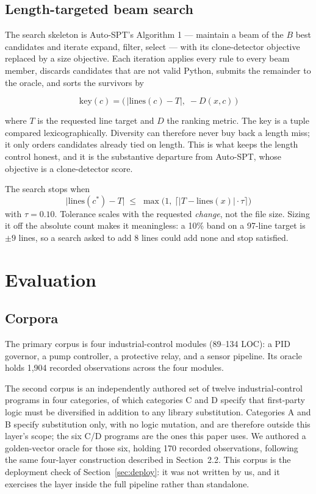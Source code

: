 \documentclass[10pt,twocolumn]{article}
\begin{document}
\subsection{Length-targeted beam search}

The search skeleton is Auto-SPT's Algorithm 1 --- maintain a beam of the $B$
best candidates and iterate expand, filter, select --- with its clone-detector
objective replaced by a size objective. Each iteration applies every rule to
every beam member, discards candidates that are not valid Python, submits the
remainder to the oracle, and sorts the survivors by

\begin{equation}
\mathrm{key}(c) = \bigl(\,\lvert \mathrm{lines}(c) - T \rvert,\; -D(x, c)\,\bigr)
\label{eq:key}
\end{equation}

where $T$ is the requested line target and $D$ the ranking metric. The key is a
tuple compared lexicographically. Diversity can therefore never buy back a
length miss; it only orders candidates already tied on length. This is what
keeps the length control honest, and it is the substantive departure from
Auto-SPT, whose objective is a clone-detector score.

The search stops when
\begin{equation}
\lvert \mathrm{lines}(c^{*}) - T \rvert \;\le\; \max\bigl(1,\ \lceil \lvert T - \mathrm{lines}(x) \rvert \cdot \tau \rceil \bigr)
\label{eq:tol}
\end{equation}
with $\tau = 0.10$. Tolerance scales with the requested \emph{change}, not the
file size. Sizing it off the absolute count makes it meaningless: a 10\% band on
a 97-line target is $\pm 9$ lines, so a search asked to add 8 lines could add
none and stop satisfied.

\section{Evaluation}

\subsection{Corpora}

The primary corpus is four industrial-control modules (89--134 LOC): a PID
governor, a pump controller, a protective relay, and a sensor pipeline. Its
oracle holds 1{,}904 recorded observations across the four modules.

The second corpus is an independently authored set of twelve industrial-control
programs in four categories, of which categories C and D specify that
first-party logic must be diversified in addition to any library substitution.
Categories A and B specify substitution only, with no logic mutation, and are
therefore outside this layer's scope; the six C/D programs are the ones this
paper uses. We authored a golden-vector oracle for those six, holding 170
recorded observations, following the same four-layer construction described in
Section~2.2. This corpus is the deployment check of
Section~\ref{sec:deploy}: it was not written by us, and it exercises the layer
inside the full pipeline rather than standalone.
\end{document}
